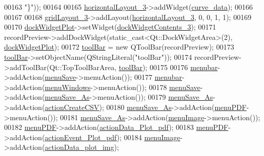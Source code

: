 \begin{DoxyCode}
00163 \textcolor{stringliteral}{"\}"}));
00164 
00165         \hyperlink{a00028_a14cf293099dc18a097ecd71460db1701}{horizontalLayout\_3}->addWidget(\hyperlink{a00028_a247d94481323c0bc4f8b6458a8a535dd}{curve\_data});
00166 
00167 
00168         \hyperlink{a00028_a4edfeb379ee365973f74b0e422fd9916}{gridLayout\_3}->addLayout(\hyperlink{a00028_a14cf293099dc18a097ecd71460db1701}{horizontalLayout\_3}, 0, 0, 1, 1);
00169 
00170         \hyperlink{a00028_a07b76f17803ec09e0367b72938bbd097}{dockWidgetPlot}->setWidget(\hyperlink{a00028_a26b0f4ae45c1aa0cfd8037f25a2f290f}{dockWidgetContents\_3});
00171         recordPreview->addDockWidget(static\_cast<Qt::DockWidgetArea>(2), 
      \hyperlink{a00028_a07b76f17803ec09e0367b72938bbd097}{dockWidgetPlot});
00172         \hyperlink{a00028_ac94509c2cd16337592e1634b0f2a6020}{toolBar} = \textcolor{keyword}{new} QToolBar(recordPreview);
00173         \hyperlink{a00028_ac94509c2cd16337592e1634b0f2a6020}{toolBar}->setObjectName(QStringLiteral(\textcolor{stringliteral}{"toolBar"}));
00174         recordPreview->addToolBar(Qt::TopToolBarArea, \hyperlink{a00028_ac94509c2cd16337592e1634b0f2a6020}{toolBar});
00175 
00176         \hyperlink{a00028_adddc4285028693f10dfd49cd08276e83}{menubar}->addAction(\hyperlink{a00028_a5ef77bf8c78c201d83049ee8b40cf345}{menuSave}->menuAction());
00177         \hyperlink{a00028_adddc4285028693f10dfd49cd08276e83}{menubar}->addAction(\hyperlink{a00028_afd93511da273fc2c6a88472d154cb176}{menuWindows}->menuAction());
00178         \hyperlink{a00028_a5ef77bf8c78c201d83049ee8b40cf345}{menuSave}->addAction(\hyperlink{a00028_aaf69c873ec3bf0ea397829122ca4a224}{menuSave\_As}->menuAction());
00179         \hyperlink{a00028_aaf69c873ec3bf0ea397829122ca4a224}{menuSave\_As}->addAction(\hyperlink{a00028_ae81b7303db9e9c5d730c59b86ec0e960}{actionCreateCSV});
00180         \hyperlink{a00028_aaf69c873ec3bf0ea397829122ca4a224}{menuSave\_As}->addAction(\hyperlink{a00028_a4cdb6b113583d4ef43a08b5526c13e3a}{menuPDF}->menuAction());
00181         \hyperlink{a00028_aaf69c873ec3bf0ea397829122ca4a224}{menuSave\_As}->addAction(\hyperlink{a00028_af1ff1ecbe6ea007cfeda320cca9865b7}{menuImage}->menuAction());
00182         \hyperlink{a00028_a4cdb6b113583d4ef43a08b5526c13e3a}{menuPDF}->addAction(\hyperlink{a00028_a19203ba5fef3bc68f3d88f1dd3c94777}{actionData\_Plot\_pdf});
00183         \hyperlink{a00028_a4cdb6b113583d4ef43a08b5526c13e3a}{menuPDF}->addAction(\hyperlink{a00028_a4369770edbf9cb6131a066ca10b3f863}{actionEvent\_Plot\_pdf});
00184         \hyperlink{a00028_af1ff1ecbe6ea007cfeda320cca9865b7}{menuImage}->addAction(\hyperlink{a00028_ae841c150cf6131bef2e8d12da0401ce2}{actionData\_plot\_img});

\end{DoxyCode}

